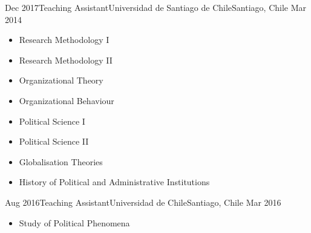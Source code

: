 \begin{experiences}
  \emptySeparator 
  \experience 
    {Dec 2017}{Teaching Assistant}{Universidad de Santiago de Chile}{Santiago, Chile} {Mar 2014}
    {\begin{itemize}
    \item Research Methodology I
    \item Research Methodology II
    \item Organizational Theory
    \item Organizational Behaviour
    \item Political Science I
    \item Political Science II
    \item Globalisation Theories
    \item History of Political and Administrative Institutions
    \end{itemize}}
    {}
\end{experiences}
\vspace{-2mm}

\begin{experiences}
  \emptySeparator 
  \experience 
    {Aug 2016}{Teaching Assistant}{Universidad de Chile}{Santiago, Chile} {Mar 2016}
    {\begin{itemize}
    \item Study of Political Phenomena
    \end{itemize}}
    {}
\end{experiences}
